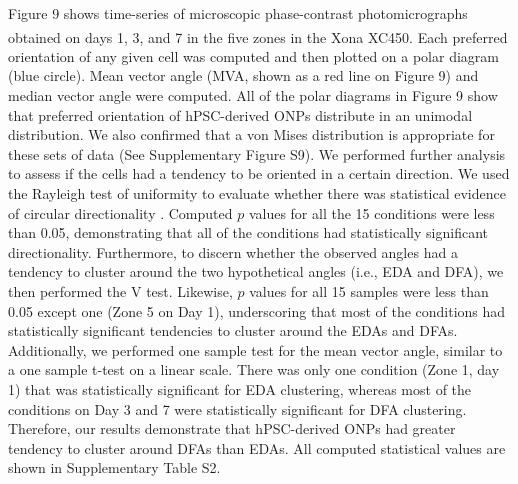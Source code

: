 \documentclass[review]{elsarticle}
\begin{document}
\indent Figure 9 shows time-series of microscopic phase-contrast photomicrographs obtained on days 1, 3, and 7 in the five zones in the Xona\textsuperscript{\texttrademark} XC450. Each preferred orientation of any given cell was computed and then plotted on a polar diagram (blue circle). Mean vector angle (MVA, shown as a red line on Figure 9) and median vector angle were computed. All of the polar diagrams in Figure 9 show that preferred orientation of hPSC-derived ONPs distribute in an unimodal distribution. We also confirmed that a von Mises distribution is appropriate for these sets of data (See Supplementary Figure S9). We performed further analysis to assess if the cells had a tendency to be oriented in a certain direction. We used the Rayleigh test of uniformity to evaluate whether there was statistical evidence of circular directionality \cite{Batschelet1981}. Computed $p$ values for all the 15 conditions were less than 0.05, demonstrating that all of the conditions had statistically significant directionality. Furthermore, to discern whether the observed angles had a tendency to cluster around the two hypothetical angles (i.e., EDA and DFA), we then performed the V test. Likewise, $p$ values for all 15 samples were less than 0.05 except one (Zone 5 on Day 1), underscoring that most of the conditions had statistically significant tendencies to cluster around the EDAs and DFAs. Additionally, we performed one sample test for the mean vector angle, similar to a one sample t-test on a linear scale. There was only one condition (Zone 1, day 1) that was statistically significant for EDA clustering, whereas most of the conditions on Day 3 and 7 were statistically significant for DFA clustering. Therefore, our results demonstrate that hPSC-derived ONPs had greater tendency to cluster around DFAs than EDAs. All computed statistical values are shown in Supplementary Table S2.
\end{document}
